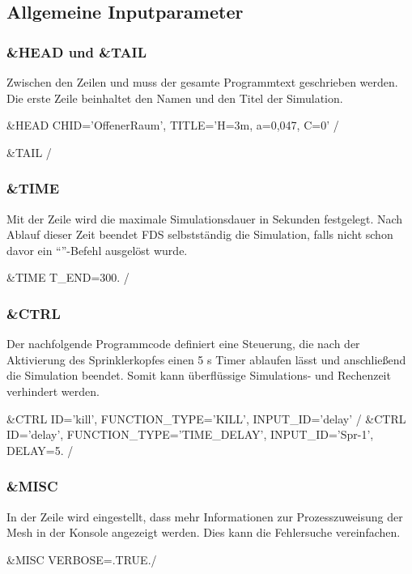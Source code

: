 \subsection{Allgemeine Inputparameter}
\label{sec:Allgemeine}

\subsubsection{\&HEAD und \&TAIL}
Zwischen den Zeilen  und  muss der gesamte Programmtext geschrieben werden. Die erste Zeile beinhaltet den Namen und den Titel der Simulation.
\begin{GenericCode}[numbers=none]
&HEAD CHID='OffenerRaum', TITLE='H=3m, a=0,047, C=0' /

&TAIL /
\end{GenericCode}


\subsubsection{\&TIME}
Mit der  Zeile wird die maximale Simulationsdauer in Sekunden festgelegt. Nach Ablauf dieser Zeit beendet FDS selbstständig die Simulation, falls nicht schon davor ein "`"'-Befehl ausgelöst wurde. 
\begin{GenericCode}[numbers=none]
&TIME T_END=300. /
\end{GenericCode}

\subsubsection{\&CTRL}

Der nachfolgende Programmcode definiert eine Steuerung, die nach der Aktivierung des Sprinklerkopfes einen 5 s Timer ablaufen lässt und anschließend die Simulation beendet. Somit kann überflüssige Simulations- und Rechenzeit verhindert werden.
\begin{GenericCode}[numbers=none]
&CTRL ID='kill', FUNCTION_TYPE='KILL', INPUT_ID='delay' /
&CTRL ID='delay', FUNCTION_TYPE='TIME_DELAY', INPUT_ID='Spr-1', DELAY=5. /
\end{GenericCode}

\subsubsection{\&MISC}
In der Zeile  wird eingestellt, dass mehr Informationen zur Prozesszuweisung der Mesh in der Konsole angezeigt werden. Dies kann die Fehlersuche vereinfachen.
\begin{GenericCode}[numbers=none]
&MISC VERBOSE=.TRUE./
\end{GenericCode}

